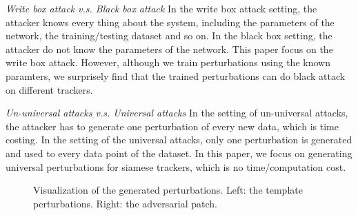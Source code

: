 \documentclass[journal]{IEEEtran}
\begin{document}
\textit{Write box attack v.s. Black box attack} In the write box attack setting, the attacker knows every thing about the system, including the parameters of the network, the training/testing dataset and so on. In the black box setting, the attacker do not know the parameters of the network. This paper focus on the write box attack. However, although we train perturbations using the known paramters, we surprisely find that the trained perturbations can do black attack on different trackers.

\textit{Un-universal attacks v.s. Universal attacks} In the setting of un-universal attacks, the attacker has to generate one perturbation of every new data, which is time costing. In the setting of the universal attacks, only one perturbation is generated and used to every data point of the dataset. In this paper, we focus on generating universal perturbations for siamese trackers, which is no time/computation cost.

\begin{figure}[t]
  \centering
   \qquad
  \caption{Visualization of the generated perturbations. Left: the template perturbations. Right: the adversarial patch.}
  \label{fig:vis_perturbations}
\end{figure}
\end{document}
